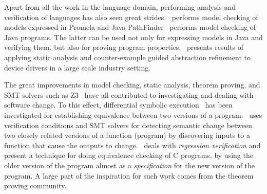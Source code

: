 Apart from all the work in the language domain, performing analysis
and verification of languages has also seen great
strides.~\cite{holzmann-spin-2004} performs model checking of models
expressed in Promela and Java
PathFinder~\cite{havelund-jpf-00,havelund-visser02} performs model
checking of Java programs. The latter can be used not only for
expressing models in Java and verifying them, but also for proving
program properties.~\cite{ball2010slam2} presents results of applying
static analysis and counter-example guided abstraction refinement to
device drivers in a large scale industry setting. 

The great improvements in model checking, static analysis, theorem
proving, and SMT solvers such as Z3~\cite{de2008z3} have all
contributed to investigating and dealing with software change. To this
effect, differential symbolic execution~\cite{person2008differential}
has been investigated for establishing equivalence between two
versions of a program.~\cite{lahiri2012symdiff} uses verification
conditions and SMT solvers for detecting semantic change between two
closely related versions of a function (program) by discovering inputs
to a function that cause the outputs to
change.~\cite{godlin2009regression} deals with \emph{regression
  verification} and present a technique for doing equivalence checking
of C programs, by using the older version of the program almost as a
\emph{specification} for the new version of the program. A large part
of the inspiration for such work comes from the theorem proving
community.



